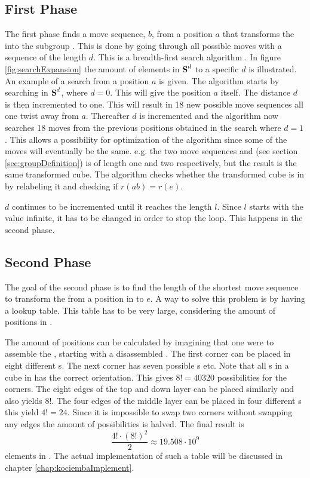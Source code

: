\subsection{First Phase}
\label{sub:firstPhase}
The first phase finds a move sequence, $b$, from a position $a$ that transforms the \rubik{} into the subgroup . 
This is done by going through all possible moves with a sequence of the length $d$. 
This is a breadth-first search algorithm \cite[pp. 729-731]{Rosen07}.
In figure \ref{fig:searchExpansion} the amount of elements in $\textbf{S}^d$ to a specific $d$ is illustrated.
An example of a search from a position $a$ is given. The algorithm starts by searching in $\textbf{S}^{d}$, where $d =  0$. This will give the position $a$ itself. The distance $d$ is then incremented to one. 
This will result in 18 new possible move sequences all one twist away from $a$. 
Thereafter $d$ is incremented and the algorithm now searches 18 moves from the previous positions obtained in the search where $d = 1$. 
This allows a possibility for optimization of the algorithm since some of the moves will eventually be the same. e.g. the two move sequences  and  (see section \ref{sec:groupDefinition}) is of length one and two respectively, but the result is the same transformed cube. The algorithm checks whether the transformed cube is in  by relabeling it and checking if $r(ab) = r(e)$. 

$d$ continues to be incremented until it reaches the length $l$. Since $l$ starts with the value infinite, it has to be changed in order to stop the loop. This happens in the second phase.




\subsection{Second Phase}
\label{sub:secondPhase}
The goal of the second phase is to find the length of the shortest move sequence to transform the \rubik{} from a position in  to $e$. A way to solve this problem is by having a lookup table. This table has to be very large, considering the amount of positions in . 

The amount of positions can be calculated by imagining that one were to assemble the \rubik{}, starting with a disassembled \rubik{}. The first corner \cpiece{} can be placed in eight different \cubicle{}s. The next corner has seven possible \cubicle{}s etc. Note that all \cpiece{}s in a cube in  has the correct orientation. 
This gives $8! = 40320$ possibilities for the corners. 
The eight edges of the top and down layer can be placed similarly and also yields $8!$.  
The four edges of the middle layer can be placed in four different \cubicle{}s this yield $4! = 24$. Since it is impossible to swap two corners without swapping any edges the amount of possibilities is halved. 
The final result is 
\begin{equation*}
\frac{4!\cdot(8!)^{2}}{2} \approx 19.508\cdot10^{9}
\end{equation*}
elements in .
The actual implementation of such a table will be discussed in chapter \ref{chap:kociembaImplement}.